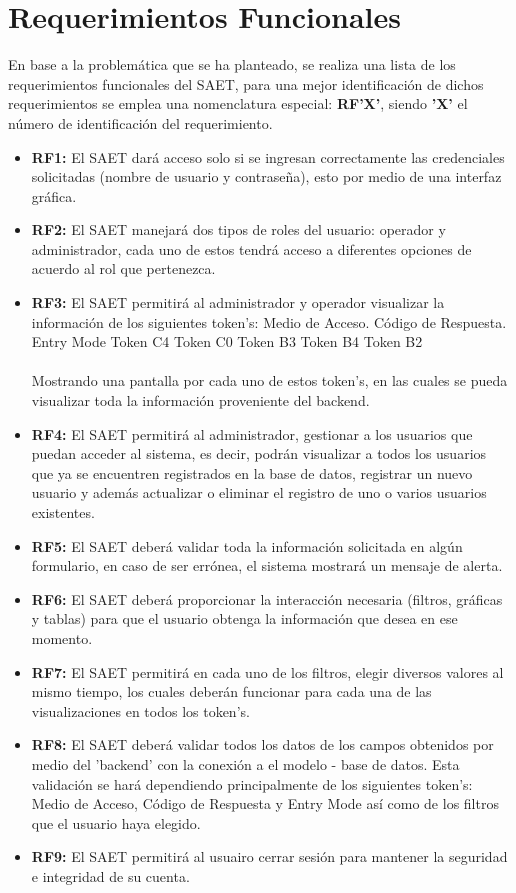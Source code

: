 \section{Requerimientos Funcionales}
En base a la problemática que se ha planteado, se realiza una lista de los requerimientos funcionales del SAET, para una mejor identificación de dichos requerimientos se emplea una nomenclatura especial: \textbf{RF'X'}, siendo \textbf{'X'} el número de identificación del requerimiento. 
\begin{itemize}
	\item \textbf{RF1:} El SAET dará acceso solo si se ingresan correctamente las credenciales solicitadas (nombre de usuario y contraseña), esto por medio de una interfaz gráfica.
	\item \textbf{RF2:} El SAET manejará dos tipos de roles del usuario: operador y administrador, cada uno de estos tendrá acceso a diferentes opciones de acuerdo al rol que pertenezca.
	\item \textbf{RF3:} El SAET permitirá al administrador y operador visualizar la información de los siguientes token's: 
		\subitem Medio de Acceso.
		\subitem Código de Respuesta.
		\subitem Entry Mode
		\subitem Token C4
		\subitem Token C0
		\subitem Token B3
		\subitem Token B4
		\subitem Token B2
	\\ \\
	Mostrando una pantalla por cada uno de estos token's, en las cuales se pueda visualizar toda la información proveniente del backend.
	\item  \textbf{RF4:} El SAET permitirá al administrador, gestionar a los usuarios que puedan acceder al sistema, es decir, podrán visualizar a todos los usuarios que ya se encuentren registrados en la base de datos, registrar un nuevo usuario y además actualizar o eliminar el registro de uno o varios usuarios existentes.
	\item  \textbf{RF5:} El SAET deberá validar toda la información solicitada en algún formulario, en caso de ser errónea, el sistema mostrará un mensaje de alerta. 
	\item \textbf{RF6:} El SAET deberá proporcionar la interacción necesaria (filtros, gráficas y tablas) para que el usuario obtenga la información que desea en ese momento. 
	\item \textbf{RF7:} El SAET permitirá en cada uno de los filtros, elegir diversos valores al mismo tiempo, los cuales deberán funcionar para cada una de las visualizaciones en todos los token's.
	\item  \textbf{RF8:} El SAET deberá validar todos los datos de los campos obtenidos por medio del 'backend' con la conexión a el modelo - base de datos. Esta validación se hará dependiendo principalmente de los siguientes token's: Medio de Acceso, Código de Respuesta y Entry Mode así como de los filtros que el usuario haya elegido.
	\item \textbf{RF9:} El SAET permitirá al usuairo cerrar sesión para mantener la seguridad e integridad de su cuenta.
\end{itemize} 